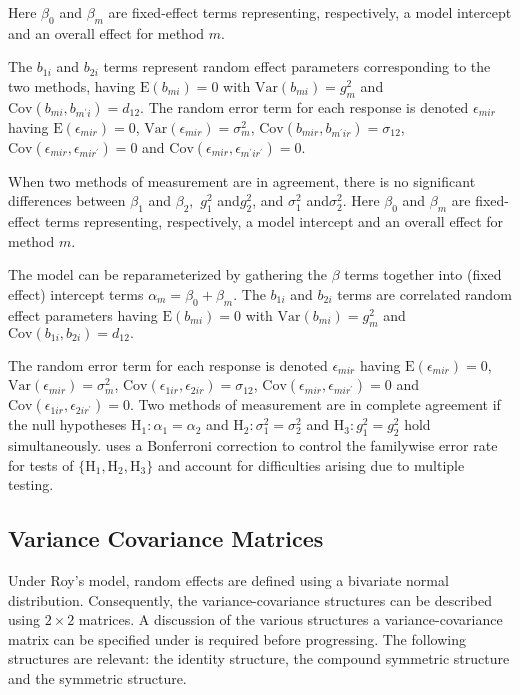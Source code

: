 \documentclass[12pt, a4paper]{report}
\theoremstyle{plain}
\theoremstyle{definition}
\theoremstyle{remark}
\begin{document}
	Here $\beta_0$ and $\beta_m$ are fixed-effect terms representing, respectively, a model intercept and an overall effect for method $m.$ 
	
	The $b_{1i}$ and $b_{2i}$ terms represent random effect parameters corresponding to the two methods, having $\mathrm{E}(b_{mi})=0$ with $\mathrm{Var}(b_{mi})=g^2_m$ and $\mathrm{Cov}(b_{mi}, b_{m^\prime i})=d_{12}.$ The random error term for each response is denoted $\epsilon_{mir}$ having $\mathrm{E}(\epsilon_{mir})=0$, $\mathrm{Var}(\epsilon_{mir})=\sigma^2_m$, $\mathrm{Cov}(b_{mir}, b_{m^\prime ir})=\sigma_{12}$, $\mathrm{Cov}(\epsilon_{mir}, \epsilon_{mir^\prime})= 0$ and $\mathrm{Cov}(\epsilon_{mir}, \epsilon_{m^\prime ir^\prime})= 0.$
	
	
	When two methods of measurement are in agreement, there is no significant differences between $\beta_1$ and $\beta_2,$ $g^2_1 $ and$ g^2_2$, and $\sigma^2_1 $ and$ \sigma^2_2$.
	Here $\beta_0$ and $\beta_m$ are fixed-effect terms representing, respectively, a model intercept and an overall effect for method $m.$ 
	
	The model can be reparameterized by gathering the $\beta$ terms together into (fixed effect) intercept terms $\alpha_m=\beta_0+\beta_m.$ The $b_{1i}$ and $b_{2i}$ terms are correlated random effect parameters having $\mathrm{E}(b_{mi})=0$ with $\mathrm{Var}(b_{mi})=g^2_m$ and $\mathrm{Cov}(b_{1i}, b_{2 i})=d_{12}.$ 
	
	The random error term for each response is denoted $\epsilon_{mir}$ having $\mathrm{E}(\epsilon_{mir})=0$, $\mathrm{Var}(\epsilon_{mir})=\sigma^2_m$, $\mathrm{Cov}(\epsilon_{1ir}, \epsilon_{2 ir})=\sigma_{12}$, $\mathrm{Cov}(\epsilon_{mir}, \epsilon_{mir^\prime})= 0$ and $\mathrm{Cov}(\epsilon_{1ir}, \epsilon_{2 ir^\prime})= 0.$ Two methods of measurement are in complete agreement if the null hypotheses $\mathrm{H}_1\colon \alpha_1 = \alpha_2$ and $\mathrm{H}_2\colon \sigma^2_1 = \sigma^2_2 $ and $\mathrm{H}_3\colon g^2_1= g^2_2$ hold simultaneously. \citet{ARoy2009} uses a Bonferroni correction to control the familywise error rate for tests of $\{\mathrm{H}_1, \mathrm{H}_2, \mathrm{H}_3\}$ and account for difficulties arising due to multiple testing. 
		\subsection{Variance Covariance Matrices }
		
		Under Roy's model, random effects are defined using a bivariate normal distribution. Consequently, the variance-covariance structures can be described using $2 \times 2$  matrices. A discussion of the various structures a variance-covariance matrix can be specified under is required before progressing. The following structures are relevant: the identity structure, the compound symmetric structure and the symmetric structure.
		
\end{document}

